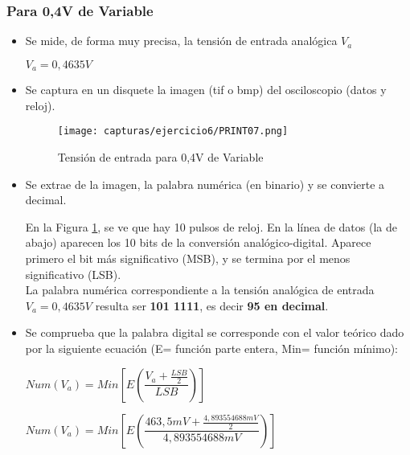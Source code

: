 	\subsubsection{Para 0,4V de Variable}
	\begin{itemize}
		\item Se mide, de forma muy precisa, la tensión de entrada analógica $ V_{a} $
		
		$ V_{a} = 0,4635 V$
		\item Se captura en un disquete la imagen (tif o bmp) del osciloscopio (datos y reloj).
		\begin{figure}[H] %
			\centering
			\texttt{[image: capturas/ejercicio6/PRINT07.png]} 
			\caption{Tensión de entrada para 0,4V de Variable}
			\label{fig:practica6-3}
		\end{figure}
		\item Se extrae de la imagen, la palabra numérica (en binario) y se convierte a decimal.
		
		En la Figura  \ref{fig:practica6-3}, se ve que hay 10 pulsos de reloj. En la línea de datos (la de abajo) aparecen los 10 bits de la conversión
		analógico-digital. Aparece primero el bit más significativo (MSB), y se termina por el menos significativo (LSB).\\
		
		La palabra numérica
		correspondiente a la tensión analógica de entrada $ V_{a} = 0,4635 V$ resulta ser \textbf{101 1111}, es decir \textbf{95 en decimal}.
		
		\item Se comprueba que la palabra digital se corresponde con el valor teórico dado por la siguiente
		ecuación (E= función parte entera, Min= función mínimo):
		
		\begin{center}
			$ Num(V_{a}) = Min [E(\dfrac{V_{a} + \frac{LSB}{2}}{LSB})]$
		\end{center}
		
		$ Num(V_{a}) = Min [E(\dfrac{463,5mV + \frac{4,893554688mV}{2}}{4,893554688mV})] $ \hspace{3pt} {\fboxrule=1pt \fboxsep=6pt
			}			
	\end{itemize}


